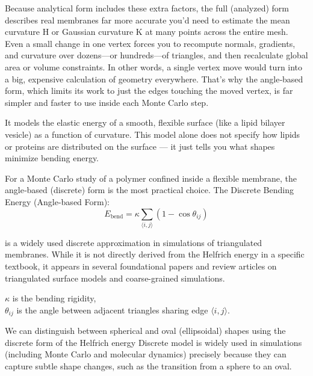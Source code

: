 \documentclass[12pt]{article}
\begin{document}
\begin{flushleft}
Because analytical form includes these extra factors, the full (analyzed) form describes real membranes far more accurate you’d need to estimate the mean curvature H or Gaussian curvature K at many points across the entire mesh. Even a small change in one vertex forces you to recompute normals, gradients, and curvature over dozens—or hundreds—of triangles, and then recalculate global area or volume constraints. In other words, a single vertex move would turn into a big, expensive calculation of geometry everywhere. That’s why the angle‐based form, which limits its work to just the edges touching the moved vertex, is far simpler and faster to use inside each Monte Carlo step.












It models the elastic energy of a smooth, flexible surface (like a lipid bilayer vesicle) as a function of curvature. This model alone does not specify how lipids or proteins are distributed on the surface — it just tells you what shapes minimize bending energy.








For a Monte Carlo study of a polymer confined inside a flexible membrane, the angle‐based (discrete) form is the most practical choice. The Discrete Bending Energy (Angle-based Form):
\begin{equation}
E_{\text{bend}} = \kappa \sum_{\langle i,j \rangle} \left(1 - \cos \theta_{ij} \right)
\end{equation}



\noindent is a widely used discrete approximation in simulations of triangulated membranes. While it is not directly derived from the Helfrich energy in a specific textbook, it appears in several foundational papers and review articles on triangulated surface models and coarse-grained simulations\cite{gompper1997triangulated}.

$\kappa$ is the bending rigidity,\\
$\theta_{ij}$ is the angle between adjacent triangles sharing edge $\langle i, j \rangle$.




We can distinguish between spherical and oval (ellipsoidal) shapes using the discrete form of the Helfrich energy
Discrete model is widely used in simulations (including Monte Carlo and molecular dynamics) precisely because they can capture subtle shape changes, such as the transition from a sphere to an oval.











\end{flushleft}
\end{document}
